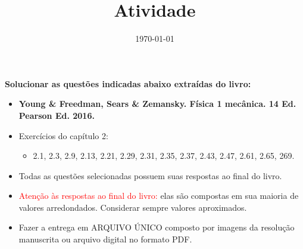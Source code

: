 \documentclass[a4paper, 11pt]{article}
\date{\today}
\title{Atividade}
\begin{document}
    \header{}
    \vspace{6pt}
    \textbf{Solucionar as questões indicadas abaixo extraídas do livro:}
    \begin{itemize}
        \item \textbf{Young \& Freedman, Sears \& Zemansky. Física 1 mecânica. 14 Ed. Pearson Ed. 2016.}
        \item Exercícios do capítulo 2:
        \begin{itemize}
            \item 2.1, 2.3, 2.9, 2.13, 2.21, 2.29, 2.31, 2.35, 2.37, 2.43, 2.47, 2.61, 2.65, 269.
        \end{itemize}
        \item Todas as questões selecionadas possuem suas respostas ao final do livro.
        \item \textcolor{red}{Atenção às respostas ao final do livro:} elas são compostas em sua maioria de valores arredondados. Considerar sempre valores aproximados.
        \item Fazer a entrega em ARQUIVO ÚNICO composto por imagens da resolução manuscrita ou arquivo digital no formato PDF. 
    \end{itemize}
    
\end{document}
